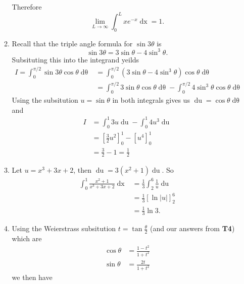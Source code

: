 \documentclass[12pt,oneside]{book}
\begin{document}
\begin{enumerate}
\begin{enumerate}
            Therefore \[
                \lim_{L \to \infty} \int_{0}^{L} xe^{-x} \mathop{\mathrm{d}x} = 1 
            .\] 
            \item Recall that the triple angle formula for $\sin 3 \theta$ is \[
                \sin 3\theta = 3 \sin \theta - 4 \sin^3 \theta
            .\] Subsituting this into the integrand yeilds \begin{align*}
                I = \int_{0}^{\pi/2} \sin 3\theta \cos \theta \mathop{\mathrm{d}\theta} &= \int_{0}^{\pi/2} (3 \sin \theta - 4 \sin^3 \theta) \cos \theta \mathop{\mathrm{d}\theta}   \\
                &= \int_{0}^{\pi/2} 3\sin \theta \cos \theta \mathop{\mathrm{d}\theta} - \int_{0}^{\pi/2} 4\sin^3 \theta \cos \theta \mathop{\mathrm{d}\theta}   
            \end{align*}
            Using the subsitution $u = \sin \theta$ in both integrals gives us \newline $\mathop{\mathrm{d}u} = \cos \theta \mathop{\mathrm{d}\theta}$ and \begin{align*}
                I &= \int_{0}^{1} 3u \mathop{\mathrm{d}u} - \int_{0}^{1} 4u^3 \mathop{\mathrm{d}u} \\
                &= \left[ \frac{3}{2} u^2 \right]_0^1 - \left[ u^4 \right]_0^1 \\
                &= \frac{3}{2} - 1 = \frac{1}{2}      
            \end{align*}
            \item Let $u = x^3 + 3x + 2$, then $\mathop{\mathrm{d}u} = 3(x^2 + 1) \mathop{\mathrm{d}u}$. So \begin{align*}
                \int_{0}^{1} \frac{x^2 + 1}{x^3 + 3x + 2} \mathop{\mathrm{d}x} &= \frac{1}{3} \int_{2}^{6} \frac{1}{u} \mathop{\mathrm{d}u} \\
                &= \frac{1}{3} \left[ \ln \left| u \right| \right]_2^6 \\
                &= \frac{1}{3} \ln 3.  
            \end{align*} 
            \item Using the Weierstrass subsitution $t = \tan \frac{\theta}{2}$ (and our answers from \textbf{T4}) which are \begin{align*}
                \cos \theta &= \frac{1 - t^2}{1 + t^2} \\
                \sin \theta &= \frac{2t}{1+ t^2}
            \end{align*} we then have \begin{align*}

\end{align*}
\end{enumerate}
\end{enumerate}
\end{document}
